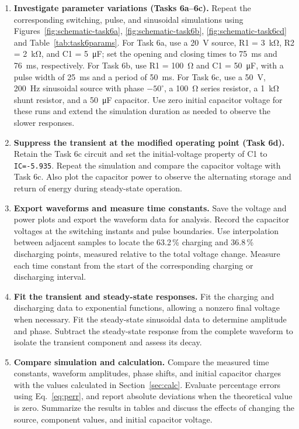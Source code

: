 \documentclass[12pt,a4paper]{article}
\begin{document}
\begin{enumerate}[label=\arabic*., leftmargin=2.5em, itemsep=6pt]
		\item \textbf{Investigate parameter variations (Tasks 6a--6c).}
		Repeat the corresponding switching, pulse, and sinusoidal
		simulations using
		Figures~\ref{fig:schematic-task6a}, \ref{fig:schematic-task6b},
		\ref{fig:schematic-task6cd}
		and Table~\ref{tab:task6params}.  For Task 6a, use a
		\SI{20}{\volt} source, R1 = \SI{3}{\kilo\ohm},
		R2 = \SI{2}{\kilo\ohm}, and C1 = \SI{5}{\micro\farad};
		set the opening and closing times to \SI{75}{\milli\second}
		and \SI{76}{\milli\second}, respectively.
		For Task 6b, use R1 = \SI{100}{\ohm} and
		C1 = \SI{50}{\micro\farad}, with a pulse width of
		\SI{25}{\milli\second} and a period of
		\SI{50}{\milli\second}.  For Task 6c, use a
		\SI{50}{\volt}, \SI{200}{\hertz} sinusoidal source with
		phase $-50^\circ$, a \SI{100}{\ohm} series resistor,
		a \SI{1}{\kilo\ohm} shunt resistor, and a
		\SI{50}{\micro\farad} capacitor.  Use zero initial
		capacitor voltage for these runs and extend the simulation
		duration as needed to observe the slower responses.
		
		\item \textbf{Suppress the transient at the modified operating
			point (Task 6d).}
		Retain the Task 6c circuit and set the initial-voltage property
		of C1 to \texttt{IC=-5.935}.  Repeat the simulation and
		compare the capacitor voltage with Task 6c.  Also plot the
		capacitor power to observe the alternating storage and return
		of energy during steady-state operation.
		
		\item \textbf{Export waveforms and measure time constants.}
		Save the voltage and power plots and export the waveform data
		for analysis.  Record the capacitor voltages at the switching
		instants and pulse boundaries.  Use interpolation between
		adjacent samples to locate the 63.2\,\% charging and
		36.8\,\% discharging points, measured relative to the total
		voltage change.  Measure each time constant from the start of
		the corresponding charging or discharging interval.
		
		\item \textbf{Fit the transient and steady-state responses.}
		Fit the charging and discharging data to exponential functions,
		allowing a nonzero final voltage when necessary.  Fit the
		steady-state sinusoidal data to determine amplitude and phase.
		Subtract the steady-state response from the complete waveform
		to isolate the transient component and assess its decay.
		
		\item \textbf{Compare simulation and calculation.}
		Compare the measured time constants, waveform amplitudes,
		phase shifts, and initial capacitor charges with the values
		calculated in Section~\ref{sec:calc}.  Evaluate percentage
		errors using Eq.~\eqref{eq:perr}, and report absolute
		deviations when the theoretical value is zero.  Summarize the
		results in tables and discuss the effects of changing the
		source, component values, and initial capacitor voltage.
	\end{enumerate}
	
\end{document}
